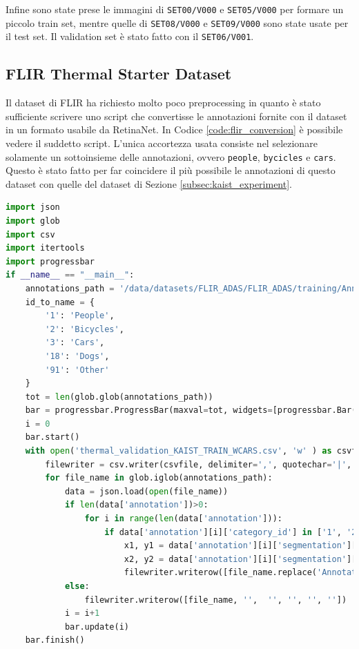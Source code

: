 Infine sono state prese le immagini di \texttt{SET00/V000} e \texttt{SET05/V000} per formare un piccolo train set, mentre quelle di \texttt{SET08/V000} e \texttt{SET09/V000} sono state usate per il test set. Il validation set è stato fatto con il \texttt{SET06/V001}. 

\subsection{FLIR Thermal Starter Dataset}
\label{subsec:flir_experiment}
Il dataset di FLIR ha richiesto molto poco preprocessing in quanto è stato sufficiente scrivere uno script che convertisse le annotazioni fornite con il dataset in un formato usabile da RetinaNet. In Codice \ref{code:flir_conversion} è possibile vedere il suddetto script. L'unica accortezza usata consiste nel selezionare solamente un sottoinsieme delle annotazioni, ovvero \texttt{people}, \texttt{bycicles} e \texttt{cars}. Questo è stato fatto per far coincidere il più possibile le annotazioni di questo dataset con quelle del dataset di Sezione \ref{subsec:kaist_experiment}.

\begin{lstlisting}[caption={Script di conversione per dataset FLIR}, language=Python, basicstyle=\tiny,label=code:flir_conversion]
import json
import glob
import csv
import itertools
import progressbar
if __name__ == "__main__":
    annotations_path = '/data/datasets/FLIR_ADAS/FLIR_ADAS/training/Annotations/*.json'
    id_to_name = {
        '1': 'People',
        '2': 'Bicycles',
        '3': 'Cars',
        '18': 'Dogs',
        '91': 'Other'
    }
    tot = len(glob.glob(annotations_path))
    bar = progressbar.ProgressBar(maxval=tot, widgets=[progressbar.Bar('=', '[', ']'), ' ', progressbar.Percentage()])
    i = 0
    bar.start()
    with open('thermal_validation_KAIST_TRAIN_WCARS.csv', 'w' ) as csvfile:
        filewriter = csv.writer(csvfile, delimiter=',', quotechar='|', quoting=csv.QUOTE_MINIMAL)
        for file_name in glob.iglob(annotations_path):
            data = json.load(open(file_name))
            if len(data['annotation'])>0:
                for i in range(len(data['annotation'])):
                    if data['annotation'][i]['category_id'] in ['1', '2', '3']:
                        x1, y1 = data['annotation'][i]['segmentation'][0][0],data['annotation'][i]['segmentation'][0][1]
                        x2, y2 = data['annotation'][i]['segmentation'][0][4],data['annotation'][i]['segmentation'][0][5]
                        filewriter.writerow([file_name.replace('Annotations', 'PreviewData')]+[x1, y1, x2, y2]+[id_to_name[data['annotation'][i]['category_id']]])
            else:
                filewriter.writerow([file_name, '',  '', '', '', ''])
            i = i+1
            bar.update(i)
    bar.finish()
  
\end{lstlisting}

